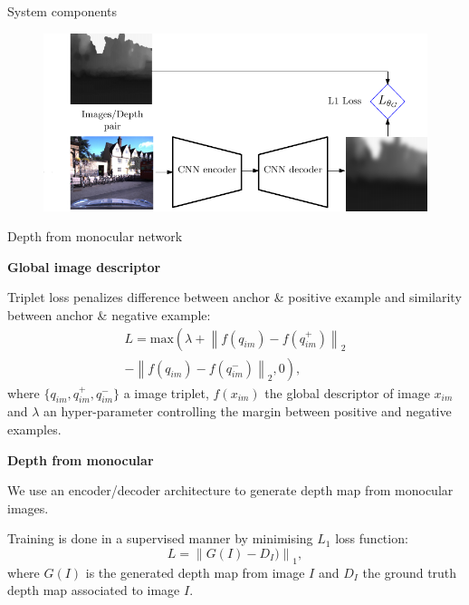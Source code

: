 \documentclass[final]{beamer}
\newlength{\colwidth}
\newcommand{\norm}[1]{\left\lVert#1\right\rVert}
\begin{document}
\begin{frame}[t]
\begin{columns}[t]
\begin{column}{\colwidth}
\begin{block}{System components}
    \begin{minipage}{0.75\linewidth}
        \centering
    	\begin{figure}
		  \includegraphics[width=\linewidth]{vect/method/fig3/enc_dec}
		\end{figure}	
    \end{minipage}\hfill
    \begin{minipage}{0.23\linewidth}
      	{\footnotesize Depth from monocular network}   
    \end{minipage}
    \vspace{1.5cm}
    
    \begin{minipage}[t]{0.52\linewidth}
    \textbf{Global image descriptor}
    
    {Triplet loss} penalizes difference between anchor \& positive example and similarity between anchor \& negative example:
	\begin{multline*}
     	L = \mathrm{max}\left(\lambda + \norm{f(q_{im}) - f(q_{im}^+)}_2 \right. \\	
	\left. - \norm{f(q_{im}) - f(q_{im}^-)}_2, 0 \right),
	\end{multline*}
where $\{q_{im}, q_{im}^+, q_{im}^-\}$ a image triplet, $f(x_{im})$ the global descriptor of image $x_{im}$ and $\lambda$ an hyper-parameter controlling the margin between positive and negative examples.
    \end{minipage}\hfill
    \begin{minipage}[t]{0.45\linewidth}
	\textbf{Depth from monocular}
	
    We use an encoder/decoder architecture to generate depth map from monocular images.
    
	Training is done in a supervised manner by minimising $L_1$ loss function:
	\begin{equation*}
     	L = \norm{G(I) - D_I)}_1,
	\end{equation*}
where $G(I)$ is the generated depth map from image $I$ and  $D_I$ the ground truth depth map associated to image $I$.    
    \end{minipage}
  \end{block}
  

\end{column}
\end{columns}
\end{frame}
\end{document}
